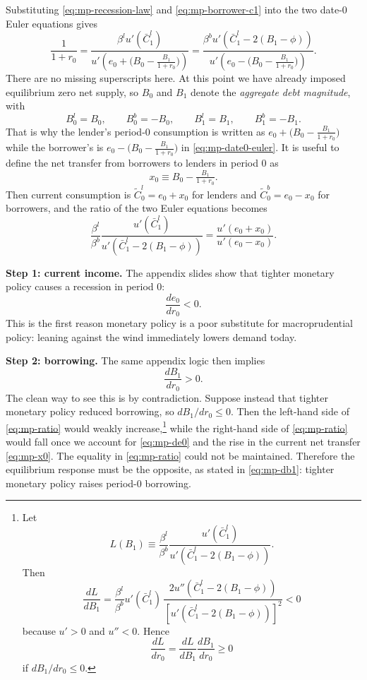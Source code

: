 \documentclass[11pt,a4paper]{article}
\begin{document}
Substituting \eqref{eq:mp-recession-law} and \eqref{eq:mp-borrower-c1} into the two date-0 Euler equations gives
\begin{equation}\label{eq:mp-date0-euler}
\frac{1}{1+r_0}
=
\frac{\beta^l u'(\bar{C}_1^l)}{u'\!\left(e_0 + \bigl(B_0-\tfrac{B_1}{1+r_0}\bigr)\right)}
=
\frac{\beta^b u'\!\left(\bar{C}_1^l-2(B_1-\phi)\right)}{u'\!\left(e_0 - \bigl(B_0-\tfrac{B_1}{1+r_0}\bigr)\right)}.
\end{equation}
There are no missing superscripts here. At this point we have already imposed equilibrium zero net supply, so $B_0$ and $B_1$ denote the \textit{aggregate debt magnitude}, with
\begin{equation}\label{eq:mp-zero-net-supply}
B_0^l=B_0,\qquad B_0^b=-B_0,\qquad B_1^l=B_1,\qquad B_1^b=-B_1.
\end{equation}
That is why the lender's period-0 consumption is written as $e_0+\bigl(B_0-\tfrac{B_1}{1+r_0}\bigr)$ while the borrower's is $e_0-\bigl(B_0-\tfrac{B_1}{1+r_0}\bigr)$ in \eqref{eq:mp-date0-euler}.
It is useful to define the net transfer from borrowers to lenders in period 0 as
\begin{equation}\label{eq:mp-x0}
x_0 \equiv B_0-\tfrac{B_1}{1+r_0}.
\end{equation}
Then current consumption is $\tilde{C}_0^l=e_0+x_0$ for lenders and $\tilde{C}_0^b=e_0-x_0$ for borrowers, and the ratio of the two Euler equations becomes
\begin{equation}\label{eq:mp-ratio}
\frac{\beta^l}{\beta^b}\frac{u'(\bar{C}_1^l)}{u'\!\left(\bar{C}_1^l-2(B_1-\phi)\right)}
=
\frac{u'(e_0+x_0)}{u'(e_0-x_0)}.
\end{equation}

\textbf{Step 1: current income.} The appendix slides show that tighter monetary policy causes a recession in period 0:
\begin{equation}\label{eq:mp-de0}
\frac{de_0}{dr_0}<0.
\end{equation}
This is the first reason monetary policy is a poor substitute for macroprudential policy: leaning against the wind immediately lowers demand today.

\textbf{Step 2: borrowing.} The same appendix logic then implies
\begin{equation}\label{eq:mp-db1}
\frac{dB_1}{dr_0}>0.
\end{equation}
The clean way to see this is by contradiction. Suppose instead that tighter monetary policy reduced borrowing, so $dB_1/dr_0\leq0$. Then the left-hand side of \eqref{eq:mp-ratio} would weakly increase,\footnote{Let
\[
L(B_1)\equiv \frac{\beta^l}{\beta^b}\frac{u'(\bar C_1^l)}{u'(\bar C_1^l-2(B_1-\phi))}.
\]
Then
\[
\frac{dL}{dB_1}
=
\frac{\beta^l}{\beta^b}u'(\bar C_1^l)\,
\frac{2u''(\bar C_1^l-2(B_1-\phi))}{\left[u'(\bar C_1^l-2(B_1-\phi))\right]^2}
<0
\]
because $u'>0$ and $u''<0$. Hence
\[
\frac{dL}{dr_0}=\frac{dL}{dB_1}\frac{dB_1}{dr_0}\ge 0
\]
if $dB_1/dr_0\le 0$.} while the right-hand side of \eqref{eq:mp-ratio} would fall once we account for \eqref{eq:mp-de0} and the rise in the current net transfer \eqref{eq:mp-x0}. The equality in \eqref{eq:mp-ratio} could not be maintained. Therefore the equilibrium response must be the opposite, as stated in \eqref{eq:mp-db1}: tighter monetary policy raises period-0 borrowing.
\end{document}
